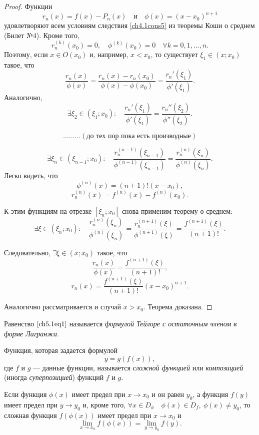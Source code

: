 \begin{proof}
Функции $$r_n(x) = f(x) - P_n(x) \quad \text{и} \quad \phi(x) = (x - x_0)^{n + 1}$$ удовлетворяют всем условиям следствия \ref{ch4.1cons5} из теоремы Коши о среднем (Билет №4). Кроме того, $$r_n^{(k)}(x_0) = 0, \quad \phi^{(k)}(x_0) = 0 \quad \forall k = 0,1,\ldots,n.$$ Поэтому, если $x \in O(x_0)$ и, например, $x < x_0$, то существует $\xi_1 \in (x; x_0)$ такое, что
$$
\frac{r_n(x)}{\phi(x)} = \frac{r_n(x) - r_n(x_0)}{\phi(x) - \phi(x_0)} = \frac{r_n'(\xi_1)}{\phi'(\xi_1)}.
$$
Аналогично,
$$
\exists \xi_2 \in (\xi_1; x_0): \quad \frac{r_n'(\xi_1)}{\phi'(\xi_1)} = \frac{r_n''(\xi_2)}{\phi''(\xi_2)}.
$$

$$\ldots\ldots\ldots (\text{до тех пор пока есть производные})$$

$$
\exists \xi_n \in (\xi_{n - 1}; x_0): \quad \frac{r_n^{(n - 1)}(\xi_{n - 1})}{\phi^{(n - 1)}(\xi_{n - 1})} = \frac{r_n^{(n)}(\xi_{n})}{\phi^{(n)}(\xi_{n})}.
$$
Легко видеть, что 
$$
\phi^{(n)}(x) = (n + 1)!(x - x_0),
$$
$$
r_n^{(n)}(x) = f^{(n)}(x) - f^{(n)}(x_0).
$$

К этим функциям на отрезке $[\xi_n; x_0]$ снова применим теорему о среднем:
$$
\exists \xi \in (\xi_n; x_0): \quad \frac{r_n^{(n)}(\xi_{n})}{\phi^{(n)}(\xi_{n})} = \frac{r_n^{(n + 1)}(\xi)}{\phi^{(n + 1)}(\xi)} = \frac{f^{(n + 1)}(\xi)}{(n + 1)!}.
$$

Следовательно, $\exists \xi \in (x; x_0)$ такое, что
$$
\frac{r_n(x)}{\phi(x)} = \frac{f^{(n + 1)}(\xi)}{(n + 1)!},
$$
$$
r_n(x) = \frac{f^{(n + 1)}(\xi)}{(n + 1)!}(x - x_0)^{n + 1}.
$$

Аналогично рассматривается и случай $x > x_0$. Теорема доказана.
\end{proof}

Равенство $\eqref{ch5.1eq1}$ называется \textit{формулой Тейлоре с остаточным членом в форме Лагранжа}.

\begin{defn}
Функция, которая задается формулой 
$$
y = g(f(x)),
$$
где $f$ и $g$ --- данные функции, называется \textit{сложной функцией} или \textit{композицией} (иногда \textit{суперпозицией}) функций $f$ и $g$.
\end{defn}

\begin{thm}
Если функция $\phi(x)$ имеет предел при $x \to x_0$ и он равен $y_0$, а функция $f(y)$ имеет предел при $y \to y_0$ и, кроме того, $\forall x \in D_\phi \quad \phi(x) \in D_f, \: \phi(x) \not= y_0$, то сложная функция $f(\phi(x))$ имеет предел при $x \to x_0$ и
\begin{equation} \label{ch5.1eq3}
\lim_{x \to x_0} f(\phi(x)) = \lim_{y \to y_0} f(y).
\end{equation}
\end{thm}


